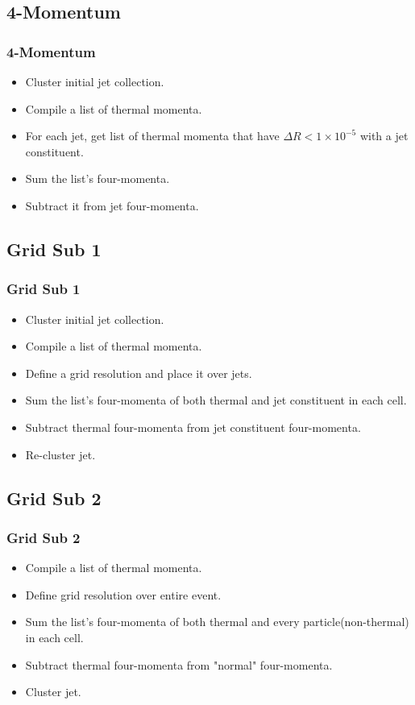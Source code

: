 \documentclass{beamer}
\begin{document}
\subsection{4-Momentum}

\begin{frame}\frametitle{4-Momentum}
	\begin{itemize}
	\item Cluster initial jet collection.
	\item Compile a list of thermal momenta.
	\item For each jet, get list of thermal momenta that have $\Delta R < 1\times 10^{-5}$ with a jet constituent.
	\item Sum the list's four-momenta.
	\item Subtract it from jet four-momenta.
	\end{itemize}
\end{frame}

\subsection{Grid Sub 1}

\begin{frame}\frametitle{Grid Sub 1}
	\begin{itemize}
	\item Cluster initial jet collection.
	\item Compile a list of thermal momenta.
	\item Define a grid resolution and place it over jets. 
	\item Sum the list's four-momenta of both thermal and jet constituent in each cell.
	\item Subtract thermal four-momenta from jet constituent four-momenta.
	\item Re-cluster jet.
	\end{itemize}
\end{frame}
\subsection{Grid Sub 2}

\begin{frame}\frametitle{Grid Sub 2}
	\begin{itemize}
	\item Compile a list of thermal momenta.
	\item Define grid resolution over entire event.
	\item Sum the list's four-momenta of both thermal and every particle(non-thermal) in each cell.
	\item Subtract thermal four-momenta from "normal" four-momenta.
	\item Cluster jet.
	\end{itemize}
\end{frame}
\end{document}
